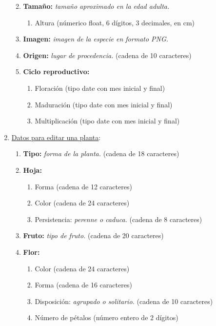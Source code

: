 \documentclass[10pt,a4paper]{article}
\begin{document}
\begin{enumerate}[label={RD\arabic*.} ,leftmargin=2.8\parindent]
\begin{enumerate}[label={RD1.\arabic*.}]
	\medskip
	
	\item
		\textbf{Tamaño:} \textit{tamaño aproximado en la edad adulta.}
	\begin{enumerate}[label=-]
		\item Altura (númerico float, 6 dígitos, 3 decimales, en cm)
	\end{enumerate}
	
	\medskip	
	\item
		\textbf{Imagen:} \textit{imagen de la especie en formato PNG.}

	\medskip 
	\item
		\textbf{Origen:} \textit{lugar de procedencia.} (cadena de 10 caracteres)
		
	\medskip 
	\item
		\textbf{Ciclo reproductivo:}
	\begin{enumerate} [label=-]
		\item Floración (tipo date con mes inicial y final)
		\item Maduración (tipo date con mes inicial y final)
		\item Multiplicación (tipo date con mes inicial y final)
	\end{enumerate}
	\medskip \medskip
		\end{enumerate}
	
	\item \underline{Datos para editar una planta}:
	\begin{enumerate}[label={RD2.\arabic*.}]
	
	\item 
		\textbf{Tipo:} \textit{forma de la planta.} (cadena de 18 caracteres)

	\medskip
	\item
		\textbf{Hoja:}
	\begin{enumerate}[label=-]
		\item Forma (cadena de 12 caracteres)
		\item Color (cadena de 24 caracteres)
		\item Persistencia: \textit{perenne o caduca.} (cadena de 8 caracteres)
	\end{enumerate}

	\medskip	
	\item
		\textbf{Fruto:} \textit{tipo de fruto.} (cadena de 20 caracteres)

	\medskip
	\item
		\textbf{Flor:}
	\begin{enumerate} [label=-]
		\item Color (cadena de 24 caracteres)
		\item Forma (cadena de 16 caracteres)
		\item Disposición: \textit{agrupado o solitario.} (cadena de 10 caracteres)
		\item Número de pétalos (número entero de 2 dígitos)
	\end{enumerate}


\end{enumerate}
\end{enumerate}
\end{document}
